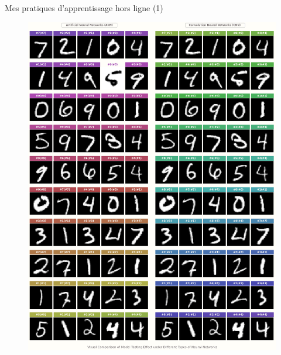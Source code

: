 \documentclass{beamer}
\begin{document}
	\begin{frame}[fragile]{Mes pratiques d'apprentissage hors ligne (1)}
		\begin{figure}[!htb]
			\endminipage\hfill
			\centering\includegraphics[width=\linewidth]{images/deep_learning_1.png}
			\endminipage\hfill

\end{figure}
\end{frame}
\end{document}
